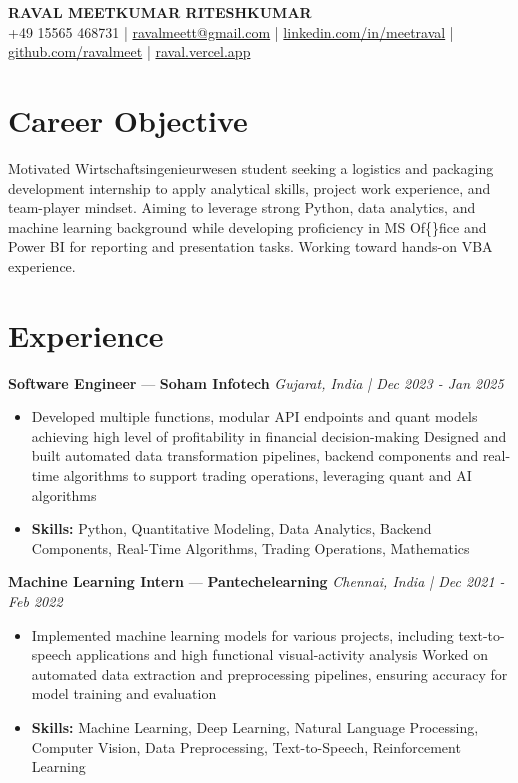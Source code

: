 \documentclass[a4paper,10pt]{article}
\begin{document}
\begin{center}
  {\Large\bfseries RAVAL MEETKUMAR RITESHKUMAR}\\[2pt]
  {\small +49 15565 468731 \;|\; \href{mailto:ravalmeett@gmail.com}{ravalmeett@gmail.com} \;|\; \href{https://www.linkedin.com/in/meetraval/}{linkedin.com/in/meetraval} \;|\; \href{https://github.com/ravalmeet}{github.com/ravalmeet} \;|\; \href{https://raval.vercel.app/}{raval.vercel.app}}
\end{center}
\vspace{-3pt}

\section*{Career Objective}
Motivated Wirtschaftsingenieurwesen student seeking a logistics and packaging development internship to apply analytical skills, project work experience, and team-player mindset. Aiming to leverage strong Python, data analytics, and machine learning background while developing proficiency in MS Of\{\}fice and Power BI for reporting and presentation tasks. Working toward hands-on VBA experience.\par

\section*{Experience}
\textbf{Software Engineer} — \textbf{Soham Infotech} \hfill \textit{Gujarat, India \;|\; Dec 2023 - Jan 2025}\par
\vspace{1pt}
\begin{itemize}
  \item Developed multiple functions, modular API endpoints and quant models achieving high level of profitability in financial decision-making Designed and built automated data transformation pipelines, backend components and real-time algorithms to support trading operations, leveraging quant and AI algorithms
  \item \textbf{Skills:} Python, Quantitative Modeling, Data Analytics, Backend Components, Real-Time Algorithms, Trading Operations, Mathematics
\end{itemize}
\vspace{3pt}
\textbf{Machine Learning Intern} — \textbf{Pantechelearning} \hfill \textit{Chennai, India \;|\; Dec 2021 - Feb 2022}\par
\vspace{1pt}
\begin{itemize}
  \item Implemented machine learning models for various projects, including text-to-speech applications and high functional visual-activity analysis Worked on automated data extraction and preprocessing pipelines, ensuring accuracy for model training and evaluation
  \item \textbf{Skills:} Machine Learning, Deep Learning, Natural Language Processing, Computer Vision, Data Preprocessing, Text-to-Speech, Reinforcement Learning
\end{itemize}
\end{document}
